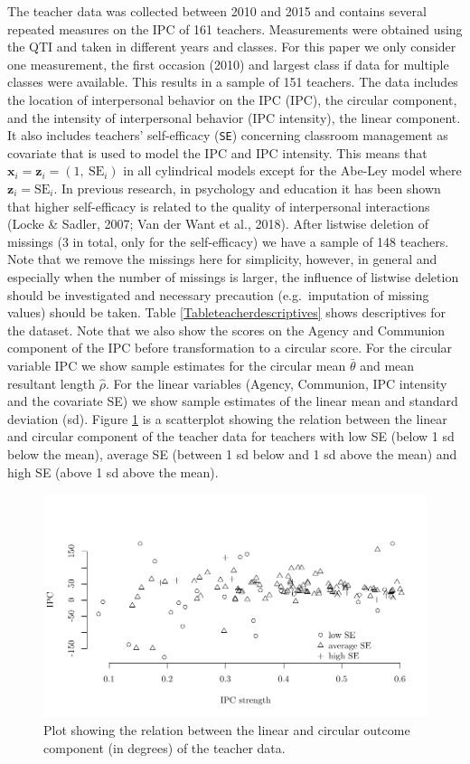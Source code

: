 \documentclass[man,mask]{apa6}
\DeclareRobustCommand{\VANDER}[3]{#2}
\begin{document}
The teacher data was collected between 2010 and 2015 and contains several
repeated measures on the IPC of 161 teachers. Measurements were obtained using
the QTI and taken in different years and classes. For this paper we only
consider one measurement, the first occasion (2010) and largest class if data
for multiple classes were available. This results in a sample of 151 teachers.
The data includes the location of interpersonal behavior on the IPC (IPC), the
circular component, and the intensity of interpersonal behavior (IPC intensity),
the linear component. It also includes teachers' self-efficacy (\verb|SE|)
concerning classroom management as covariate that is used to model the IPC and
IPC intensity. This means that \(\boldsymbol{x}_i = \boldsymbol{z}_i = (1,\: \text{SE}_i)\) in all cylindrical models except for the Abe-Ley model where
\(\boldsymbol{z}_i = \text{SE}_i\). In previous research, in psychology and
education it has been shown that higher self-efficacy is related to the quality
of interpersonal interactions (Locke \& Sadler, 2007; \VANDER{Want}{Van der}{van der} Want et al., 2018).
After listwise deletion of missings (\(3\) in total, only for the self-efficacy)
we have a sample of 148 teachers. Note that we remove the missings here for
simplicity, however, in general and especially when the number of missings is
larger, the influence of listwise deletion should be investigated and necessary
precaution (e.g.~imputation of missing values) should be taken. Table
\ref{Tableteacherdescriptives} shows descriptives for the dataset. Note that we
also show the scores on the Agency and Communion component of the IPC before
transformation to a circular score. For the circular variable IPC we show sample
estimates for the circular mean \(\bar{\theta}\) and mean resultant length
\(\hat{\rho}\). For the linear variables (Agency, Communion, IPC intensity and the
covariate SE) we show sample estimates of the linear mean and standard deviation
(sd). Figure \ref{dataplot} is a scatterplot showing the relation between the
linear and circular component of the teacher data for teachers with low SE
(below 1 sd below the mean), average SE (between 1 sd below and 1 sd above the
mean) and high SE (above 1 sd above the mean).

\begin{figure}
\centering
\includegraphics[width = \textwidth]{Plots/dataplot.pdf}
\caption{Plot showing the relation between the linear and circular outcome component (in degrees) of the teacher data.}
\label{dataplot}
\end{figure}
\end{document}
